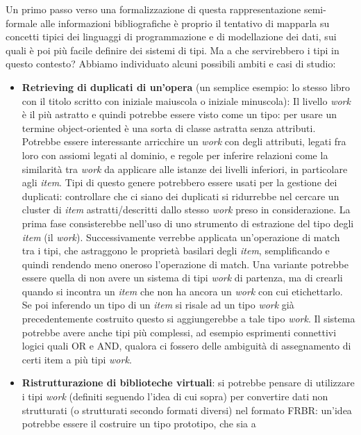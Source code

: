 Un primo passo verso una formalizzazione di questa rappresentazione semi-formale alle informazioni bibliografiche è proprio il tentativo di mapparla su 
concetti tipici dei linguaggi di programmazione e di modellazione dei dati, sui quali è poi più facile definire dei sistemi di tipi. Ma a che servirebbero i 
tipi in questo contesto? Abbiamo individuato alcuni possibili ambiti e casi di studio:

\begin{itemize}
    \item \textbf{Retrieving di duplicati di un’opera} (un semplice esempio: lo stesso libro con il titolo scritto con iniziale maiuscola o iniziale minuscola): Il livello \emph{work} è il più astratto e 
    quindi potrebbe essere visto come un tipo: per usare un termine object-oriented è una sorta di classe astratta senza attributi. Potrebbe essere 
    interessante arricchire un \emph{work} con degli attributi, legati fra loro con assiomi legati al dominio, e regole per inferire relazioni come la similarità 
    tra \emph{work} da applicare alle istanze dei livelli inferiori, in particolare agli \emph{item}. Tipi di questo genere potrebbero essere usati per la gestione dei 
    duplicati: controllare che ci siano dei duplicati si ridurrebbe nel cercare un cluster di \emph{item} astratti/descritti dallo stesso \emph{work} preso in 
    considerazione. La prima fase consisterebbe nell'uso di uno strumento di estrazione del tipo degli \emph{item} (il \emph{work}). Successivamente verrebbe applicata 
    un'operazione di match tra i tipi, che astraggono le proprietà basilari degli \emph{item}, semplificando e quindi rendendo meno oneroso l'operazione di match. 
    Una variante potrebbe essere quella di non avere un sistema di tipi \emph{work} di partenza, ma di crearli quando si incontra un \emph{item} che non ha ancora un \emph{work} 
    con cui etichettarlo. Se poi inferendo un tipo di un \emph{item} si risale ad un tipo \emph{work} già precedentemente costruito questo si aggiungerebbe a tale tipo \emph{work}. Il sistema potrebbe avere anche tipi più complessi, 
    ad esempio esprimenti connettivi logici quali OR e AND, qualora ci fossero delle ambiguità di assegnamento di certi item a più tipi \emph{work}.
    \item \textbf{Ristrutturazione di biblioteche virtuali}: si potrebbe pensare di utilizzare i tipi \emph{work} (definiti seguendo l'idea di cui sopra) per convertire 
    dati non strutturati (o strutturati secondo formati diversi) nel formato FRBR: un'idea potrebbe essere il costruire un tipo prototipo, che sia a 

\end{itemize}
